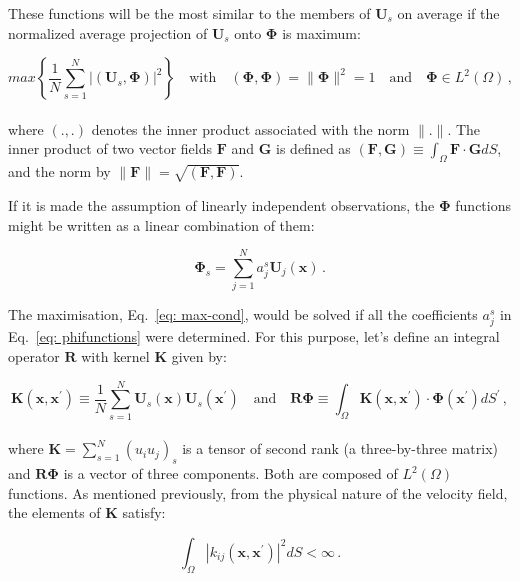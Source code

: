 \documentclass[12pt,a4paper]{article}
\newcommand{\bv}[1]{\mathbf{#1}}
\newcommand{\xp}{x^{\mathbf{\prime}}}
\begin{document}
These functions will be the most similar to the members of $\bv{U}_{s}$ on average if the normalized average projection of $\bv{U}_{s}$ onto $\bv{\Phi}$ is maximum:


\begin{equation}\label{eq: max-cond}
max \left \lbrace \frac{1}{N} \sum_{s=1}^{N} | \left(\bv{U}_{s} , \bv{\Phi}\right) |^2 \right \rbrace \quad \text{with} \quad (\bv{\Phi},\bv{\Phi}) =  \parallel \bv{\Phi} \parallel^2 = 1 \quad \text{and} \quad \bv{\Phi} \in L^2 (\Omega) \,,
\end{equation}
\\
where $(.,.)$ denotes the inner product associated with the norm $\parallel . \parallel$. The inner product of two vector fields $\bv{F}$ and $\bv{G}$ is defined as $(\bv{F},\bv{G}) \equiv \int_{\Omega} {\bv{F} \cdot \bv{G}} dS$, and the norm by $\parallel \bv{F} \parallel = \sqrt{(\bv{F},\bv{F})}$.


If it is made the assumption of linearly independent observations, the $\bv{\Phi}$ functions might be written as a linear combination of them:


\begin{equation}\label{eq: phifunctions}
 \bv{\Phi}_s = \sum_{j=1}^{N} a^{s}_{j} \bv{U}_{j}(\bv{x}) \,.
\end{equation}


The maximisation, Eq.~\eqref{eq: max-cond}, would be solved if all the coefficients $a^{s}_{j}$ in Eq.~\eqref{eq: phifunctions} were determined. For this purpose, let's define an integral operator $\bv{R}$ with kernel $\bv{K}$ given by:


\begin{equation}\label{KandR}
 \bv{K} (\bv{x}, \bv{x}^{\prime}) \equiv \frac{1}{N} \sum_{s=1}^{N} \bv{U}_s (\bv{x}) \bv{U}_s (\bv{\xp}) \quad \text{and} \quad \bv{R} \bv{\Phi} \equiv \int_{\Omega} \bv{K} (\bv{x}, \bv{x}^{\prime}) \cdot \bv{\Phi}(\bv{x}^{\prime}) dS^{\prime} \,,
\end{equation}
\\
where $\bv{K}=\sum_{s=1}^{N} (u_i u_j)_s$ is a tensor of second rank (a three-by-three matrix) and $\bv{R} \bv{\Phi}$ is a vector of three components. Both are composed of $L^2(\Omega)$ functions. As mentioned previously, from the physical nature of the velocity field, the elements of $\bv{K}$ satisfy:


\begin{equation}\label{eq: kernel}
 \int_{\Omega} | k_{ij} (\bv{x},\bv{\xp}) |^{2} dS < \infty \,.
\end{equation}
\end{document}
